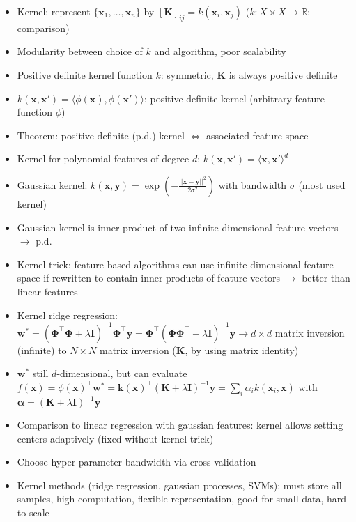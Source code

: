 \documentclass[11pt]{scrartcl}
\begin{document}
\begin{itemize}
    \item Kernel: represent \( \{ \bm{x}_1, \dots, \bm{x}_n \} \) by \( [ \bm{K} ]_{ij} = 
        k ( \bm{x}_i, \bm{x}_j ) \) (\(k : X \times X \rightarrow \mathbb{R} \): comparison)
    \item Modularity between choice of \( k \) and algorithm, poor scalability
    \item Positive definite kernel function \( k \): symmetric, \( \bm{K}\) is always positive 
        definite
    \item \( k ( \bm{x}, \bm{x}' ) = \langle \phi ( \bm{x} ), \phi ( \bm{x}' ) \rangle \): 
        positive definite kernel (arbitrary feature function \( \phi \))
    \item Theorem: positive definite (p.d.) kernel \( \Leftrightarrow \) associated feature 
        space
    \item Kernel for polynomial features of degree \( d \): \( k ( \bm{x}, \bm{x}' ) = 
        \langle \bm{x}, \bm{x}' \rangle^d \)
    \item Gaussian kernel: \( k ( \bm{x}, \bm{y} ) = 
        \exp ( - \frac{|| \bm{x} - \bm{y} ||^2}{2 \sigma^2} ) \) with bandwidth \( \sigma \) 
        (most used kernel)
    \item Gaussian kernel is inner product of two infinite dimensional feature vectors 
        \( \rightarrow \) p.d.
    \item Kernel trick: feature based algorithms can use infinite dimensional feature space if 
        rewritten to contain inner products of feature vectors \( \rightarrow \) better than 
        linear features
    \item Kernel ridge regression: \( \bm{w}^* = 
        ( \bm{\Phi}^\top \bm{\Phi} + \lambda \bm{I} )^{- 1} \bm{\Phi}^\top \bm{y} = 
        \bm{\Phi}^\top ( \bm{\Phi} \bm{\Phi}^\top + \lambda \bm{I} )^{- 1} \bm{y} \rightarrow 
        d \times d \) matrix inversion (infinite) to \( N \times N \) matrix inversion 
        (\( \bm{K} \), by using matrix identity)
    \item \( \bm{w}^* \) still \( d \)-dimensional, but can evaluate \( f ( \bm{x} ) = 
        \phi ( \bm{x} )^\top \bm{w}^* = 
        \bm{k} ( \bm{x} )^\top ( \bm{K} + \lambda \bm{I} )^{- 1} \bm{y} = 
        \sum_i \alpha_i k ( \bm{x}_i, \bm{x} ) \) with \( \bm{\alpha} = 
        ( \bm{K} + \lambda \bm{I} )^{- 1} \bm{y} \)
    \item Comparison to linear regression with gaussian features: kernel allows setting 
        centers adaptively (fixed without kernel trick)
    \item Choose hyper-parameter bandwidth via cross-validation
    \item Kernel methods (ridge regression, gaussian processes, SVMs): must store all samples, 
        high computation, flexible representation, good for small data, hard to scale 
\end{itemize}
\end{document}
